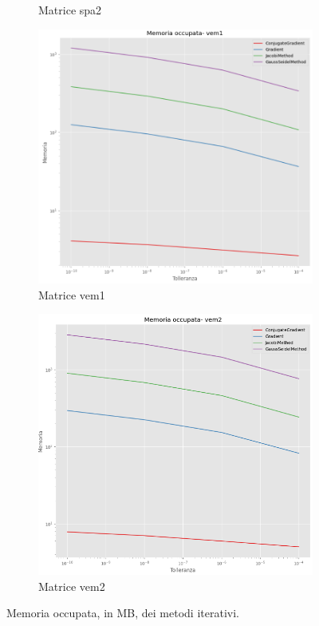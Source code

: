 \begin{figure}[!ht]
\begin{subfigure}{0.45\textwidth}
        \caption{Matrice spa2}
        \label{fig:mem_spa2}
    \end{subfigure}
    \begin{subfigure}{0.45\textwidth}
        \centering
        \includegraphics[width=\textwidth]{./../report/Progetto_1_bis/img/mem_vem1.png}
        \caption{Matrice vem1}
        \label{fig:mem_vem1}
    \end{subfigure}
    \begin{subfigure}{0.45\textwidth}
        \centering
        \includegraphics[width=\textwidth]{./../report/Progetto_1_bis/img/mem_vem2.png}
        \caption{Matrice vem2}
        \label{fig:mem_vem2}
    \end{subfigure}
    \caption{Memoria occupata, in MB, dei metodi iterativi.}
    \label{fig:memory}
\end{figure}

